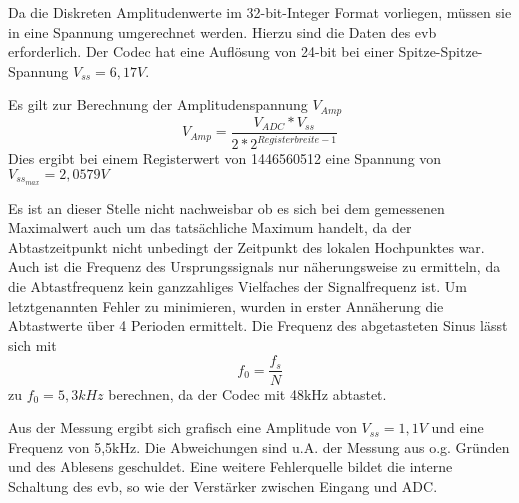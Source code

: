 Da die Diskreten Amplitudenwerte im 32-bit-Integer Format vorliegen, müssen sie in eine Spannung umgerechnet werden. Hierzu sind die Daten des \gls{evb} erforderlich.
Der Codec hat eine Auflösung von 24-bit bei einer Spitze-Spitze-Spannung 
\begin{math}V_{ss}=6,17V\end{math}.\\\par
\pagebreak
Es gilt zur Berechnung der Amplitudenspannung \begin{math}V_{Amp}\end{math}
\begin{equation}\label{umrechnungRegisterzuSpannung}
  V_{Amp}=\frac{V_{ADC}*V_{ss}}{2*2^{Registerbreite-1}}
\end{equation} 
Dies ergibt bei einem Registerwert von 1446560512 eine Spannung von 
\begin{math}V_{ss_{max}}=2,0579V\end{math}\\\par
Es ist an dieser Stelle nicht nachweisbar ob es sich bei dem gemessenen Maximalwert auch um das tatsächliche Maximum handelt, 
da der Abtastzeitpunkt nicht unbedingt der Zeitpunkt des lokalen Hochpunktes war.
Auch ist die Frequenz des Ursprungssignals nur näherungsweise zu ermitteln, da die Abtastfrequenz kein ganzzahliges Vielfaches der Signalfrequenz ist. 
Um letztgenannten Fehler zu minimieren, wurden in erster Annäherung die Abtastwerte über 4 Perioden ermittelt.
Die Frequenz des abgetasteten Sinus lässt sich mit
\begin{equation}\label{freqAbgetastetesSignal}
 f_0=\frac{f_s}N 
\end{equation}  
zu \begin{math}f_0 = 5,3kHz\end{math} berechnen, da der Codec mit 48kHz 
abtastet.\\\par
Aus der Messung ergibt sich grafisch eine Amplitude von \begin{math}V_{ss}=1,1V\end{math} und eine Frequenz von 5,5kHz. 
Die Abweichungen sind u.A. der Messung aus o.g. Gründen und des Ablesens geschuldet. 
Eine weitere Fehlerquelle bildet die interne Schaltung des \gls{evb}, so wie der Verstärker zwischen Eingang und ADC.
